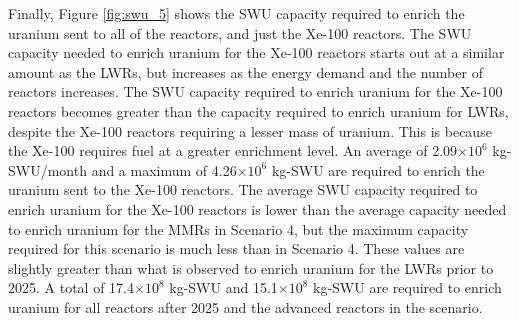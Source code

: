 Finally, Figure \ref{fig:swu_5} shows the \gls{SWU} capacity required
to enrich the uranium sent to all of the reactors, and just the Xe-100
reactors. The \gls{SWU} capacity needed 
to enrich uranium for the Xe-100 reactors starts out at a similar 
amount as the \glspl{LWR}, but 
increases as the energy demand and the number of reactors increases. 
The \gls{SWU} capacity required to enrich uranium 
for the Xe-100 reactors becomes greater than the capacity 
required to enrich uranium for \glspl{LWR}, despite the Xe-100 
reactors requiring a lesser mass of uranium. This is because the 
Xe-100 requires fuel at a greater enrichment level. An average of 
2.09$\times 10^6$ kg-\gls{SWU}/month and a maximum of 
4.26$\times 10^6$ kg-\gls{SWU} are required to enrich the uranium sent 
to the Xe-100 reactors. The average \gls{SWU} capacity 
required to enrich uranium for the Xe-100 reactors is lower 
than the average capacity needed to enrich uranium for the \glspl{MMR}
in Scenario 4, but the maximum capacity required for this scenario is much 
less than in Scenario 4. These values are slightly greater 
than what is observed to enrich uranium for the \glspl{LWR}
prior to 2025. A total of 17.4$\times 10^8$ kg-SWU and 15.1$\times 10^8$
kg-SWU are required to enrich uranium for all reactors after 2025 and the advanced 
reactors in the scenario.  

